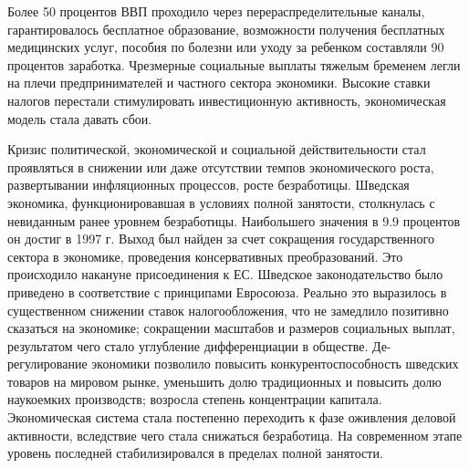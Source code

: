 \documentclass[14pt,a4paper]{article}
\begin{document}
    Более 50 процентов ВВП проходило через перераспределительные каналы, гарантировалось бесплатное образование, возможности получения бесплатных медицинских услуг, пособия по болезни или уходу за ребенком составляли 90 процентов заработка.
    Чрезмерные социальные выплаты тяжелым бременем легли на плечи предпринимателей и частного сектора экономики.
    Высокие ставки налогов перестали стимулировать инвестиционную активность, экономическая модель стала давать сбои.
    \par
    Кризис политической, экономической и социальной действительности стал проявляться в снижении или даже отсутствии темпов экономического роста, развертывании инфляционных процессов, росте безработицы.
    Шведская экономика, функционировавшая в условиях полной занятости, столкнулась с невиданным ранее уровнем безработицы.
    Наибольшего значения в 9.9 процентов он достиг в 1997 г. Выход был найден за счет сокращения государственного сектора в экономике, проведения консервативных преобразований.
    Это происходило накануне присоединения к ЕС. Шведское законодательство было приведено в соответствие с принципами Евросоюза.
    Реально это выразилось в существенном снижении ставок налогообложения, что не замедлило позитивно сказаться на экономике; сокращении масштабов и размеров социальных выплат, результатом чего стало углубление дифференциации в обществе.
    Де-регулирование экономики позволило повысить конкурентоспособность шведских товаров на мировом рынке, уменьшить долю традиционных и повысить долю наукоемких производств; возросла степень концентрации капитала.
    Экономическая система стала постепенно переходить к фазе оживления деловой активности, вследствие чего стала снижаться безработица.
    На современном этапе уровень последней стабилизировался в пределах полной занятости.
\end{document}
